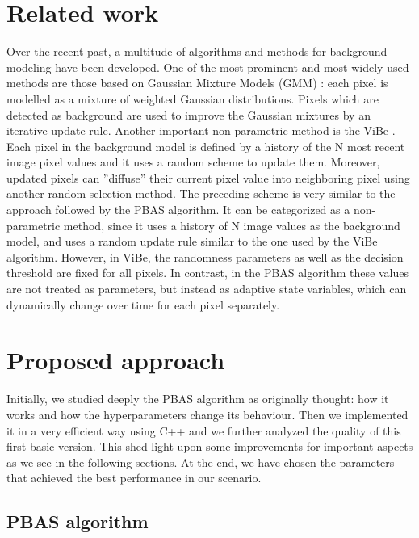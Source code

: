 \section*{Related work}
Over the recent past, a multitude of algorithms and methods for background modeling have been developed.
One of the most prominent and most widely used methods are those based on Gaussian Mixture Models (GMM) \cite{gmm}: each pixel is modelled as a mixture of weighted Gaussian distributions. Pixels which are detected as background are used to improve the Gaussian mixtures by an iterative update rule. Another important non-parametric method is the ViBe \cite{vibe}. Each pixel in the background model is defined by a history of the N most recent image pixel values and it uses a random scheme to update them.
Moreover, updated pixels can ”diffuse” their current pixel value into neighboring pixel using another random selection method. The preceding scheme is very similar to the approach followed by the PBAS \cite{pbas} algorithm.
It can be categorized as a non-parametric method, since it uses a history of N image values as the background model, and uses a random update rule similar to the one used by the ViBe algorithm. However, in ViBe, the randomness parameters as well as the decision threshold are fixed for all pixels. In contrast, in the PBAS algorithm these values are not treated as parameters, but instead as adaptive state variables, which can dynamically change over time for each pixel separately.


\section*{Proposed approach}
Initially, we studied deeply the PBAS algorithm as originally thought: how it works and how the hyperparameters change its behaviour. Then we implemented it in a very efficient way using C++ and we further analyzed the quality of this first basic version. This shed light upon some improvements for important aspects as we see in the following sections.
At the end, we have chosen the parameters that achieved the best performance in our scenario.

\subsection{PBAS algorithm} \label{subsect:PBAS}

